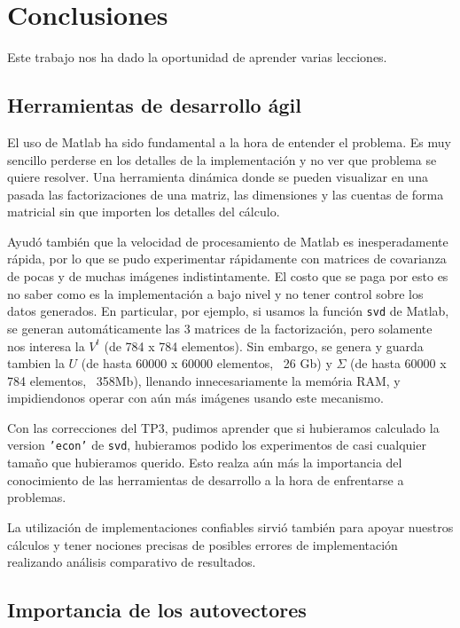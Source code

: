 \section{Conclusiones}

Este trabajo nos ha dado la oportunidad de aprender varias lecciones.

\subsection{Herramientas de desarrollo \'agil}

El uso de Matlab ha sido fundamental a la hora de entender el problema.
Es muy sencillo perderse en los detalles de la implementaci\'on y no ver que
problema se quiere resolver. Una herramienta din\'amica donde se pueden visualizar
en una pasada las factorizaciones de una matriz, las dimensiones y las cuentas
de forma matricial sin que importen los detalles del c\'alculo.

Ayud\'o tambi\'en que la velocidad de procesamiento de Matlab es inesperadamente
r\'apida, por lo que se pudo experimentar r\'apidamente con matrices de covarianza
de pocas y de muchas im\'agenes indistintamente. El costo que se paga por esto es
no saber como es la implementaci\'on a bajo nivel y no tener control sobre los datos generados.
En particular, por ejemplo, si usamos la funci\'on \texttt{svd} de Matlab, se
generan autom\'aticamente las 3 matrices de la factorizaci\'on, pero solamente nos interesa
la $V^t$ (de 784 x 784 elementos). Sin embargo, se genera y guarda tambien la $U$ (de hasta
60000 x 60000 elementos, ~26 Gb) y $\Sigma$ (de hasta 60000 x 784 elementos, ~358Mb), llenando innecesariamente
la mem\'oria RAM, y impidiendonos operar con a\'un m\'as im\'agenes usando este mecanismo.

Con las correcciones del TP3, pudimos aprender que si hubieramos calculado la version \texttt{'econ'}
de \texttt{svd}, hubieramos podido los experimentos de casi cualquier tama\~no que hubieramos querido.
Esto realza a\'un m\'as la importancia del conocimiento de las herramientas de desarrollo a la hora
de enfrentarse a problemas.

La utilizaci\'on de implementaciones confiables sirvi\'o tambi\'en para apoyar nuestros
c\'alculos y tener nociones precisas de posibles errores de implementaci\'on
realizando an\'alisis comparativo de resultados.

\subsection{Importancia de los autovectores}

